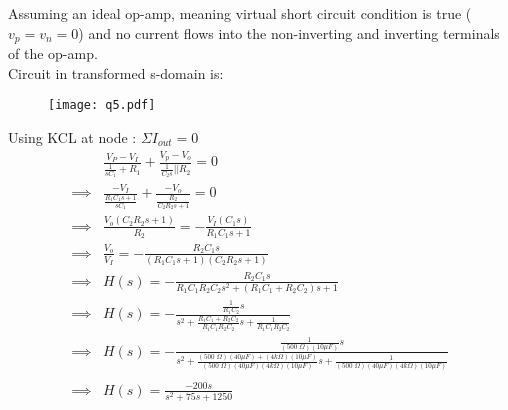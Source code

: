 
\def \Ri{500 \; \Omega}
\def \Rii{4  k\Omega}
\def \Ci{40 \mu F}
\def \Cii{10 \mu F}
Assuming an ideal op-amp, meaning virtual short circuit condition is true ($v_p = v_n = 0$) 
and no current flows into the non-inverting and inverting terminals of the op-amp.\\

Circuit in transformed s-domain is: \\

\begin{figure}[H]
\begin{center}
\texttt{[image: q5.pdf]}
\end{center}
\end{figure}

Using KCL at node : $\Sigma I_{out} = 0$
\begin{align*}
&\frac{V_P-V_I}{\frac{1}{sC_1} + R_1 } + \frac{V_p - V_o}{\frac{1}{C_2s}||R_2} = 0
\\
\implies & \frac{-V_I}{\frac{R_1C_1s + 1}{sC_1}} + \frac{- V_o}{\frac{R_2}{C_2R_2s + 1}} = 0
\\
\implies & \frac{V_o (C_2R_2s + 1)}{R_2} = -\frac{V_I(C_1s)}{R_1C_1s+1}
\\
\implies & \frac{V_o}{V_I} = - \frac{R_2C_1s}{(R_1C_1s+1)(C_2R_2s+1)}
\\
\implies & H(s) = - \frac{R_2C_1s}{R_1C_1R_2C_2s^2 + (R_1C_1 + R_2C_2)s + 1}
\\
\implies & H(s) = - \frac{\frac{1}{R_1C_2}s}{s^2 + \frac{R_1C_1 + R_2C_2}{R_1C_1R_2C_2}s + \frac{1}{R_1C_1R_2C_2}}
\\
\implies & H(s) = - \frac{\frac{1}{(\Ri)(\Cii)}s}{s^2 + 
\frac{(\Ri)(\Ci)+(\Rii)(\Cii)}{(\Ri)(\Ci)(\Rii)(\Cii)}s + \frac{1}{(\Ri)(\Ci)(\Rii)(\Cii)} }
\\ \\
\implies &H(s) = \frac{-200s}{s^2 + 75s + 1250}
\end{align*}
